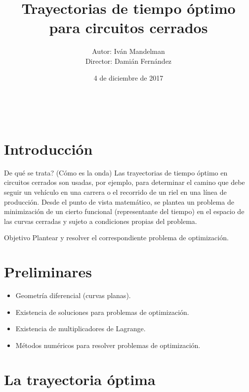 \documentclass[10pt,mathserif]{beamer}
\title{Trayectorias de tiempo óptimo para circuitos cerrados}
\author{Autor: Iván Mandelman\\
Director: Damián Fernández}
\date{4 de diciembre de 2017}
\begin{document}
\frame{\titlepage} 
$\,$\\
\section{Introducci\'on}

\begin{frame}

\begin{block}{De qué se trata? (Cómo es la onda)}
Las trayectorias de tiempo óptimo en circuitos cerrados son usadas, por ejemplo, para determinar el camino que debe seguir un vehículo en una carrera o el recorrido de un riel en una línea de producción. Desde el punto de vista matemático, se plantea un problema de minimización de un cierto funcional (representante del tiempo) en el espacio de las curvas cerradas y sujeto a condiciones propias del problema.
\end{block}


\pause

\begin{block}{Objetivo}
    Plantear y resolver el correspondiente problema de optimización.
\end{block}
\vspace{5cm}
\end{frame}

\section{Preliminares}

\begin{frame}
\begin{itemize}
    \item Geometría diferencial (curvas planas).
    \item Existencia de soluciones para problemas de optimización.
    \item Existencia de multiplicadores de Lagrange.
    \item Métodos numéricos para resolver problemas de optimización.
\end{itemize}
\end{frame}





\section{La trayectoria óptima}
\end{document}

